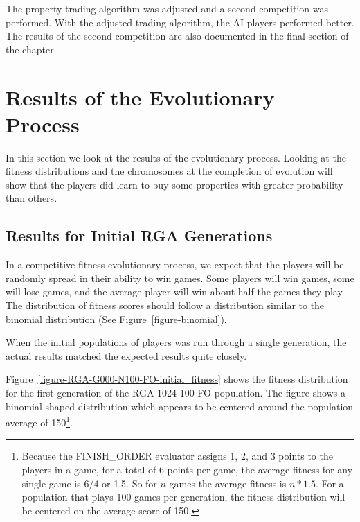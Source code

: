 The property trading algorithm was adjusted and a second competition was
performed. With the adjusted trading algorithm, the AI players performed better.
The results of the second competition are also documented in the final section
of the chapter.

\section{Results of the Evolutionary Process}

In this section we look at the results of the evolutionary process. Looking at
the fitness distributions and the chromosomes at the completion of evolution
will show that the players did learn to buy some properties with greater
probability than others.

\subsection{Results for Initial RGA Generations}

In a competitive fitness evolutionary process, we expect that the players will
be randomly spread in their ability to win games. Some players will win games,
some will lose games, and the average player will win about half the games they
play. The distribution of fitness scores should follow a distribution similar to
the binomial distribution (See Figure~\ref{figure-binomial}).

When the initial populations of players was run through a single generation, the
actual results matched the expected results quite closely. 

Figure~\ref{figure-RGA-G000-N100-FO-initial_fitness} shows the fitness
distribution for the first generation of the RGA-1024-100-FO population. The
figure shows a binomial shaped distribution which appears to be centered around
the population average of 150\footnote{Because the FINISH\_ORDER evaluator
assigns 1, 2, and 3 points to the players in a game, for a total of 6 points per
game, the average fitness for any single game is \(6/4\) or 1.5. So for \(n\)
games the average fitness is \(n * 1.5\). For a population that plays 100 games
per generation, the fitness distribution will be centered on the average score
of 150.}.

